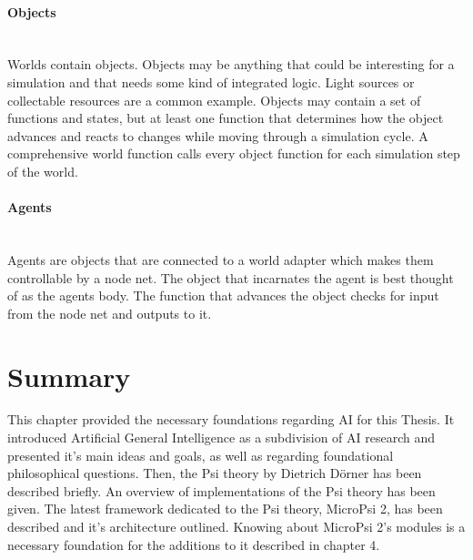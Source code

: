             \paragraph{Objects}$\;$ \\
Worlds contain objects. Objects may be anything that could be interesting for a simulation and that needs some kind of integrated logic. Light sources or collectable resources are a common example. Objects may contain a set of functions and states, but at least one function that determines how the object advances and reacts to changes while moving through a simulation cycle. A comprehensive world function calls every object function for each simulation step of the world.

            \paragraph{Agents}$\;$ \\
Agents are objects that are connected to a world adapter which makes them controllable by a node net. The object that incarnates the agent is best thought of as the agents body. The function that advances the object checks for input from the node net and outputs to it.
        
    \section{Summary}
This chapter provided the necessary foundations regarding AI for this Thesis. It introduced Artificial General Intelligence as a subdivision of AI research and presented it's main ideas and goals, as well as regarding foundational philosophical questions.
Then, the Psi theory by Dietrich Dörner has been described briefly. An overview of implementations of the Psi theory has been given. The latest framework dedicated to the Psi theory, MicroPsi 2, has been described and it's architecture outlined. Knowing about MicroPsi 2's modules is a necessary foundation for the additions to it described in chapter 4.